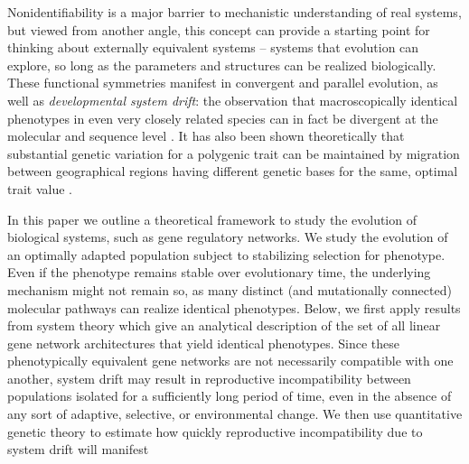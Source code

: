 \documentclass{article}
\newcommand{\1}{\mathbbm{1}}
\begin{document}
Nonidentifiability is a major barrier to mechanistic understanding of real systems, 
but viewed from another angle,
this concept can provide a starting point for thinking about externally equivalent systems
-- systems that evolution can explore, so long as the parameters and structures can be realized biologically.
These functional symmetries manifest in convergent and parallel evolution, 
as well as \emph{developmental system drift}: the observation that
macroscopically identical phenotypes in even very closely related species can in fact be divergent at the molecular and sequence level 
\citep{kimura1981possibility, true2001developmental, tanay2005conservation, tsong2006evolution, hare2008sepsid, lavoie2010evolutionary, vierstra2014mouse, matsui2015regulatory, dalal2016transcriptional, dalal2017transcription}.
It has also been shown theoretically that substantial genetic variation for a polygenic trait can be maintained
by migration between geographical regions having different genetic bases for the same, optimal trait value \citep{phillips1996maintenance}.

In this paper we outline a theoretical framework to study the evolution of biological systems, such as gene regulatory networks.
We study the evolution of an optimally adapted population subject to stabilizing selection for phenotype.
Even if the phenotype remains stable over evolutionary time, the underlying mechanism might not remain so,
as many distinct (and mutationally connected) molecular pathways can realize identical phenotypes.
Below, we first apply results from system theory which give
an analytical description of the set of 
all linear gene network architectures that yield identical phenotypes.
Since these phenotypically equivalent gene networks are not necessarily compatible with one another, 
system drift may result in reproductive incompatibility between populations 
isolated for a sufficiently long period of time, 
even in the absence of any sort of adaptive, selective, or environmental change. 
We then use quantitative genetic theory to estimate how quickly 
reproductive incompatibility due to system drift will manifest
\end{document}

